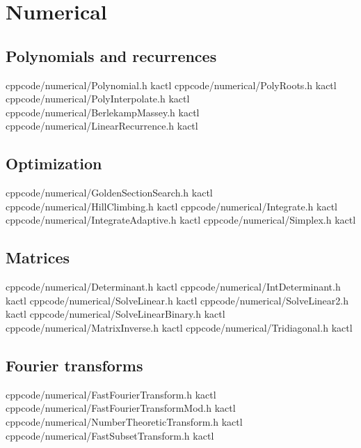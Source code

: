 \chapter{Numerical}

\section{Polynomials and recurrences}
    {}{}
    {cpp}{code/numerical/Polynomial.h}
    {kactl}
    {}{}
    {cpp}{code/numerical/PolyRoots.h}
    {kactl}
    {}{}
    {cpp}{code/numerical/PolyInterpolate.h}
    {kactl}
    {}{}
    {cpp}{code/numerical/BerlekampMassey.h}
    {kactl}
    {}{}
    {cpp}{code/numerical/LinearRecurrence.h}
    {kactl}

\section{Optimization}
    {}{}
    {cpp}{code/numerical/GoldenSectionSearch.h}
    {kactl}
    {}{}
    {cpp}{code/numerical/HillClimbing.h}
    {kactl}
    {}{}
    {cpp}{code/numerical/Integrate.h}
    {kactl}
    {}{}
    {cpp}{code/numerical/IntegrateAdaptive.h}
    {kactl}
    {}{}
    {cpp}{code/numerical/Simplex.h}
    {kactl}

\section{Matrices}
    {}{}
    {cpp}{code/numerical/Determinant.h}
    {kactl}
    {}{}
    {cpp}{code/numerical/IntDeterminant.h}
    {kactl}
    {}{}
    {cpp}{code/numerical/SolveLinear.h}
    {kactl}
    {}{}
    {cpp}{code/numerical/SolveLinear2.h}
    {kactl}
    {}{}
    {cpp}{code/numerical/SolveLinearBinary.h}
    {kactl}
    {}{}
    {cpp}{code/numerical/MatrixInverse.h}
    {kactl}
    {}{}
    {cpp}{code/numerical/Tridiagonal.h}
    {kactl}

\section{Fourier transforms}
    {}{}
    {cpp}{code/numerical/FastFourierTransform.h}
    {kactl}
    {}{}
    {cpp}{code/numerical/FastFourierTransformMod.h}
    {kactl}
    {}{}
    {cpp}{code/numerical/NumberTheoreticTransform.h}
    {kactl}
    {}{}
    {cpp}{code/numerical/FastSubsetTransform.h}
    {kactl}
